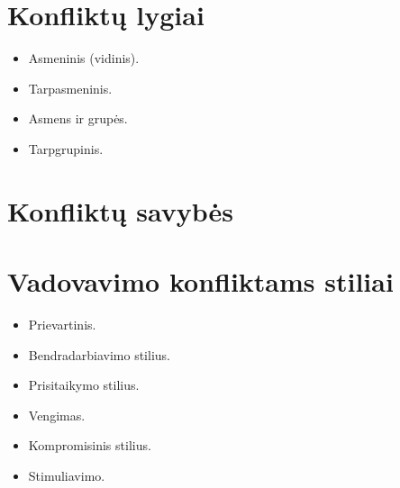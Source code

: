 \section{Konfliktų lygiai}

\begin{itemize}
  \item Asmeninis (vidinis).
  \item Tarpasmeninis.
  \item Asmens ir grupės.
  \item Tarpgrupinis.
\end{itemize}

\section{Konfliktų savybės}


\section{Vadovavimo konfliktams stiliai}

\begin{itemize}
  \item Prievartinis.
  \item Bendradarbiavimo stilius.
  \item Prisitaikymo stilius.
  \item Vengimas.
  \item Kompromisinis stilius.
  \item Stimuliavimo.
\end{itemize}

